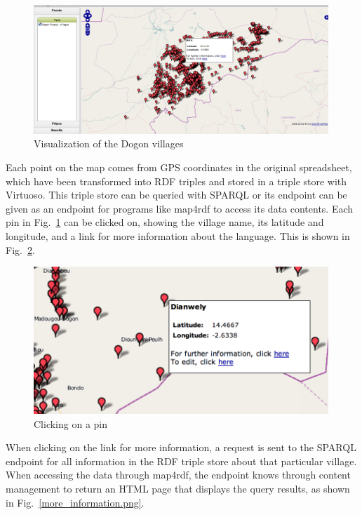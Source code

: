 \begin{figure}[htb!p]
\centering
\includegraphics[width=0.99\textwidth]{img/map4rdf.png}
\caption{Visualization of the Dogon villages}
\label{fig:map4rdf}
\end{figure}

Each point on the map comes from GPS coordinates in the original spreadsheet, which have been transformed into RDF triples and stored in a triple store with Virtuoso. This triple store can be queried with SPARQL or its endpoint can be given as an endpoint for programs like map4rdf to access its data contents.  Each pin in Fig.\ \ref{fig:map4rdf} can be clicked on, showing the village name, its latitude and longitude, and a link for more information about the language. This is shown in Fig.\ \ref{pin.png}.

\begin{figure}[htb!p]
\centering
\includegraphics[width=0.99\textwidth]{img/pin.png}
\caption{Clicking on a pin}
\label{pin.png}
\end{figure}

When clicking on the link for more information, a request is sent to the SPARQL endpoint for all information in the RDF triple store about that particular village. When accessing the data through map4rdf, the endpoint knows through content management to return an HTML page that displays the query results, as shown in Fig.\ \ref{more_information.png}.

